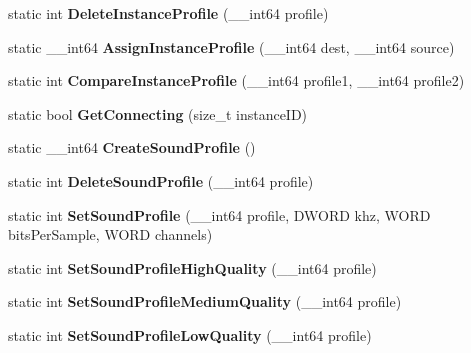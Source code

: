 \begin{DoxyCompactItemize}
\item 
\hypertarget{structmn_c_l_r_a5f934407cc482f6c987009642331ea43}{
static int {\bfseries DeleteInstanceProfile} (\_\-\_\-int64 profile)}
\label{structmn_c_l_r_a5f934407cc482f6c987009642331ea43}

\item 
\hypertarget{structmn_c_l_r_ab6b8d40815b47d60503fbdbbcd60bba6}{
static \_\-\_\-int64 {\bfseries AssignInstanceProfile} (\_\-\_\-int64 dest, \_\-\_\-int64 source)}
\label{structmn_c_l_r_ab6b8d40815b47d60503fbdbbcd60bba6}

\item 
\hypertarget{structmn_c_l_r_ad4ff3b1c8fa8285c4ea5593cd3cda236}{
static int {\bfseries CompareInstanceProfile} (\_\-\_\-int64 profile1, \_\-\_\-int64 profile2)}
\label{structmn_c_l_r_ad4ff3b1c8fa8285c4ea5593cd3cda236}

\item 
\hypertarget{structmn_c_l_r_a1438b56268dd0e0b3a6cc11830be17c3}{
static bool {\bfseries GetConnecting} (size\_\-t instanceID)}
\label{structmn_c_l_r_a1438b56268dd0e0b3a6cc11830be17c3}

\item 
\hypertarget{structmn_c_l_r_a61e66abf17f9634ba57395f6be2294d0}{
static \_\-\_\-int64 {\bfseries CreateSoundProfile} ()}
\label{structmn_c_l_r_a61e66abf17f9634ba57395f6be2294d0}

\item 
\hypertarget{structmn_c_l_r_a600807373bfa0d535afd558f53598a7f}{
static int {\bfseries DeleteSoundProfile} (\_\-\_\-int64 profile)}
\label{structmn_c_l_r_a600807373bfa0d535afd558f53598a7f}

\item 
\hypertarget{structmn_c_l_r_ae8fa2b9c20a75674bdf06e280764bb9c}{
static int {\bfseries SetSoundProfile} (\_\-\_\-int64 profile, DWORD khz, WORD bitsPerSample, WORD channels)}
\label{structmn_c_l_r_ae8fa2b9c20a75674bdf06e280764bb9c}

\item 
\hypertarget{structmn_c_l_r_a30501d013a6c3ef2b32ab8ab5fc9f182}{
static int {\bfseries SetSoundProfileHighQuality} (\_\-\_\-int64 profile)}
\label{structmn_c_l_r_a30501d013a6c3ef2b32ab8ab5fc9f182}

\item 
\hypertarget{structmn_c_l_r_ab8aa9c2fa51629262dd5394e83218201}{
static int {\bfseries SetSoundProfileMediumQuality} (\_\-\_\-int64 profile)}
\label{structmn_c_l_r_ab8aa9c2fa51629262dd5394e83218201}

\item 
\hypertarget{structmn_c_l_r_a69e90b9c9446b1c662762c51264716db}{
static int {\bfseries SetSoundProfileLowQuality} (\_\-\_\-int64 profile)}
\label{structmn_c_l_r_a69e90b9c9446b1c662762c51264716db}


\end{DoxyCompactItemize}
